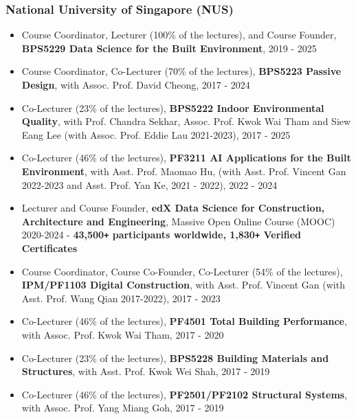\documentclass[10pt,a4paper]{article}
\begin{document}
\begin{small}
\subsubsection*{National University of Singapore (NUS)}
\begin{itemize}
\item Course Coordinator, Lecturer (100\% of the lectures), and Course Founder, \textbf{BPS5229 Data Science for the Built Environment}, 2019 - 2025
\item Course Coordinator, Co-Lecturer (70\% of the lectures), \textbf{BPS5223 Passive Design}, with Assoc. Prof. David Cheong, 2017 - 2024
\item Co-Lecturer (23\% of the lectures), \textbf{BPS5222 Indoor Environmental Quality}, with Prof. Chandra Sekhar, Assoc. Prof. Kwok Wai Tham and Siew Eang Lee (with Assoc. Prof. Eddie Lau 2021-2023), 2017 - 2025
\item Co-Lecturer (46\% of the lectures), \textbf{PF3211 AI Applications for the Built Environment}, with Asst. Prof. Maomao Hu, (with Asst. Prof. Vincent Gan 2022-2023 and Asst. Prof. Yan Ke, 2021 - 2022), 2022 - 2024
\item Lecturer and Course Founder, \textbf{edX Data Science for Construction, Architecture and Engineering}, Massive Open Online Course (MOOC) 2020-2024 - \textbf{43,500\texttt{+} participants worldwide, 1,830\texttt{+} Verified Certificates}
\item Course Coordinator, Course Co-Founder, Co-Lecturer (54\% of the lectures), \textbf{IPM/PF1103 Digital Construction}, with Asst. Prof. Vincent Gan (with Asst. Prof. Wang Qian 2017-2022), 2017 - 2023
\item Co-Lecturer (46\% of the lectures), \textbf{PF4501 Total Building Performance}, with Assoc. Prof. Kwok Wai Tham, 2017 - 2020%
\item Co-Lecturer (23\% of the lectures), \textbf{BPS5228 Building Materials and Structures}, with Asst. Prof. Kwok Wei Shah, 2017 - 2019%
\item Co-Lecturer (46\% of the lectures), \textbf{PF2501/PF2102 Structural Systems}, with Assoc. Prof. Yang Miang Goh, 2017 - 2019%
\end{itemize}


\end{small}
\end{document}
